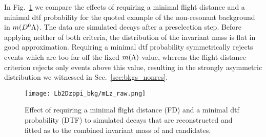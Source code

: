 In Fig.~\ref{fig:LbToDzppi_mLz_raw} we compare the effects of requiring a minimal flight distance and a minimal \gls{dtf} probability for the quoted example of the non-resonant background \decay{\Lb}{\Dz\proton\pim} in $m({{D}^0}{\Lambda})$.
The data are simulated \decay{\Lb}{\Dz\proton\pim} decays after a preselection step.
Before applying neither of both criteria, the distribution of the invariant mass is flat in good approximation.
Requiring a minimal \gls{dtf} probability symmetrically rejects events which are too far off the fixed $m({\Lambda})$ value, whereas the flight distance criterion rejects only events above this value, resulting in the strongly asymmetric distribution we witnessed in Sec.~\ref{sec:bkgs_nonres}.
\begin{figure}[htbp]
    \centering
    \texttt{[image: Lb2Dzppi\_bkg/mLz\_raw.png]}
    \caption{Effect of requiring a minimal flight distance (\Lz FD) and a minimal \gls{dtf} probability (DTF) to simulated \decay{\Lb}{\Dz\proton\pim} decays that are reconstructed and fitted as \decay{\Lb}{\Dz\Lz} to the combined invariant mass of \proton and \pim candidates.}
    \label{fig:LbToDzppi_mLz_raw}
\end{figure}

